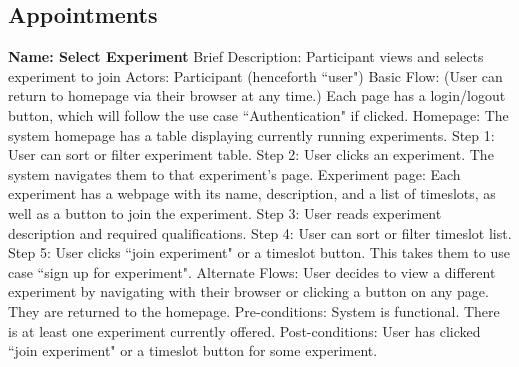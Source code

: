 \subsection{Appointments}
\begin{outline}[enumerate]


\1 {\bf Name: Select Experiment}
\2 Brief Description: Participant views and selects experiment to join
\2 Actors: Participant (henceforth ``user")
\2 Basic Flow: (User can return to homepage via their browser at any time.)  Each page has a login/logout button, which will follow the use case ``Authentication" if clicked.
\3 Homepage: The system homepage has a table displaying currently running experiments.
\3 Step 1: User can sort or filter experiment table.
\3 Step 2: User clicks an experiment.  The system navigates them to that experiment's page.
\3 Experiment page: Each experiment has a webpage with its name, description, and a list of timeslots, as well as a button to join the experiment.
\3 Step 3: User reads experiment description and required qualifications.
\3 Step 4: User can sort or filter timeslot list.
\3 Step 5: User clicks ``join experiment" or a timeslot button.  This takes them to use case ``sign up for experiment".
\2 Alternate Flows:
\3 User decides to view a different experiment by navigating with their browser or clicking a button on any page.  They are returned to the homepage.
\2 Pre-conditions:
\3 System is functional.
\3 There is at least one experiment currently offered.
\2 Post-conditions:
\3 User has clicked ``join experiment" or a timeslot button for some experiment.


\end{outline}
